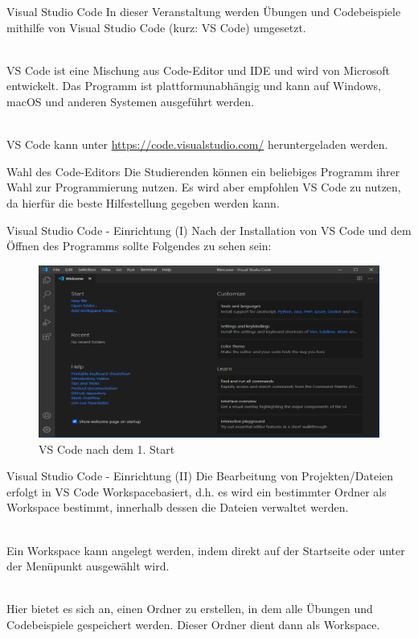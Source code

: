     \begin{frame}{Visual Studio Code}
        In dieser Veranstaltung werden Übungen und Codebeispiele mithilfe von Visual Studio Code (kurz: VS Code) umgesetzt. \\~\
        
        VS Code ist eine Mischung aus Code-Editor und IDE und wird von Microsoft entwickelt. Das Programm ist plattformunabhängig und kann auf Windows, macOS und anderen Systemen ausgeführt werden. \\~\
        
        VS Code kann unter \href{https://code.visualstudio.com/}{https://code.visualstudio.com/} heruntergeladen werden.
        
        \begin{block}{Wahl des Code-Editors}
            Die Studierenden können ein beliebiges Programm ihrer Wahl zur Programmierung nutzen. Es wird aber empfohlen VS Code zu nutzen, da hierfür die beste Hilfestellung gegeben werden kann.
        \end{block}
    \end{frame}
    
    \begin{frame}{Visual Studio Code - Einrichtung (I)}
        Nach der Installation von VS Code und dem Öffnen des Programms sollte Folgendes zu sehen sein:
        
        \begin{figure}
            \centering
            \includegraphics[keepaspectratio, width=0.9\linewidth]{chapters/08_ide/figures/vs_code_start.png}
            \caption{VS Code nach dem 1. Start}
        \end{figure}
    \end{frame}
    
    \begin{frame}{Visual Studio Code - Einrichtung (II)}
        Die Bearbeitung von Projekten/Dateien erfolgt in VS Code Workspacebasiert, d.h. es wird ein bestimmter Ordner als Workspace bestimmt, innerhalb dessen die Dateien verwaltet werden.\\~\
        
        Ein Workspace kann angelegt werden, indem direkt auf der Startseite  oder unter  der Menüpunkt  ausgewählt wird.\\~\
        
        Hier bietet es sich an, einen Ordner zu erstellen, in dem alle Übungen und Codebeispiele gespeichert werden. Dieser Ordner dient dann als Workspace.
    \end{frame}
    
